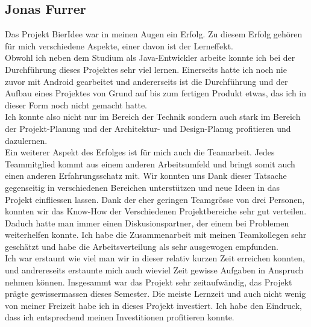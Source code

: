 \documentclass[10pt,a4paper]{scrartcl}
\begin{document}
\subsection{Jonas Furrer}
Das Projekt BierIdee war in meinen Augen ein Erfolg. Zu diesem Erfolg gehören für mich verschiedene Aspekte, einer davon 
ist der Lerneffekt.\\
Obwohl ich neben dem Studium als Java-Entwickler arbeite konnte ich bei der Durchführung dieses Projektes sehr viel 
lernen. Einerseits hatte ich noch nie zuvor mit Android gearbeitet und andererseits ist die Durchführung und der Aufbau
eines Projektes von Grund auf bis zum fertigen Produkt etwas, das ich in dieser Form noch nicht gemacht hatte.\\
Ich konnte also nicht nur im Bereich der Technik sondern auch stark im Bereich der Projekt-Planung und der 
Architektur- und Design-Planug profitieren und dazulernen.\\
Ein weiterer Aspekt des Erfolges ist für mich auch die Teamarbeit. Jedes Teammitglied kommt aus einem anderen 
Arbeitsumfeld und bringt somit auch einen anderen Erfahrungsschatz mit. Wir konnten uns Dank dieser Tatsache gegenseitig
in verschiedenen Bereichen unterstützen und neue Ideen in das Projekt einfliessen lassen. Dank der eher geringen
Teamgrösse von drei Personen, konnten wir das Know-How der Verschiedenen Projektbereiche sehr gut verteilen. Daduch
hatte man immer einen Diskusionspartner, der einem bei Problemen weiterhelfen konnte. Ich habe die Zusammenarbeit mit 
meinen Teamkollegen sehr geschätzt und habe die Arbeitsverteilung als sehr ausgewogen empfunden.\\
Ich war erstaunt wie viel man wir in dieser relativ kurzen Zeit erreichen konnten, und andrereseits erstaunte mich auch
wieviel Zeit gewisse Aufgaben in Anspruch nehmen können. Insgesammt war das Projekt sehr zeitaufwändig, das Projekt
prägte gewissermassen dieses Semester. Die meiste Lernzeit und auch nicht wenig von meiner Freizeit habe ich in dieses
Projekt investiert. Ich habe den Eindruck, dass ich entsprechend meinen Investitionen profitieren konnte.
\end{document}
